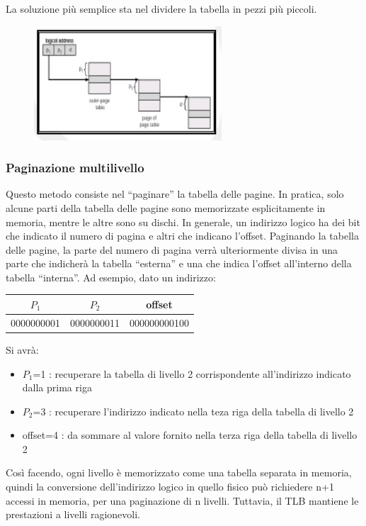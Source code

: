 \documentclass[a4paper]{article}
\begin{document}
La soluzione più semplice sta nel dividere la tabella in pezzi più piccoli.

\begin{figure}
    \includegraphics[width=7cm]{img/pagpag.JPG}
\end{figure}
\subsubsection{Paginazione multilivello}
Questo metodo consiste nel ``paginare'' la tabella delle pagine. In pratica, solo alcune parti della tabella delle pagine sono memorizzate esplicitamente in memoria, mentre le altre sono su dischi. In generale, un indirizzo logico ha dei bit che indicato il numero di pagina e altri che indicano l'offset. Paginando la tabella delle pagine, la parte del numero di pagina verrà ulteriormente divisa in una parte che indicherà la tabella ``esterna'' e una che indica l'offset all'interno della tabella ``interna''.
Ad esempio, dato un indirizzo: \newline
\begin{table}[htb]
    \centering
    \begin{tabular}{ccc}
        $P_1$                            & $P_2$                           & offset                            \\ \hline
        \multicolumn{1}{|c|}{0000000001} & \multicolumn{1}{c|}{0000000011} & \multicolumn{1}{c|}{000000000100} \\ \hline
    \end{tabular}
\end{table} \newline
Si avrà:
\begin{itemize}
    \item $P_1$=1 : recuperare la tabella di livello 2 corrispondente all'indirizzo indicato dalla prima riga
    \item $P_2$=3 : recuperare l'indirizzo indicato nella teza riga della tabella di livello 2
    \item offset=4 : da sommare al valore fornito nella terza riga della tabella di livello 2
\end{itemize}
Così facendo, ogni livello è memorizzato come una tabella separata in memoria, quindi la conversione dell'indirizzo logico in quello fisico può richiedere n+1 accessi in memoria, per una paginazione di n livelli. Tuttavia, il TLB mantiene le prestazioni a livelli ragionevoli.
\end{document}
